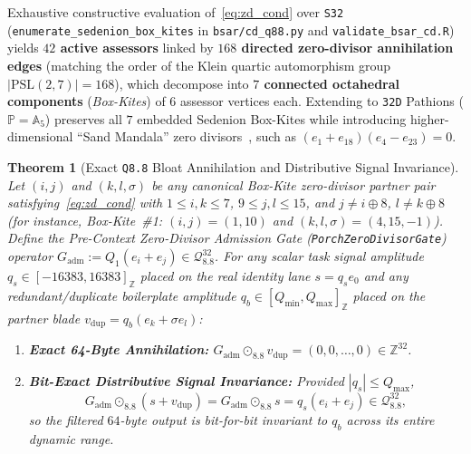 \documentclass[11pt]{article}
\theoremstyle{plain}
\newtheorem{theorem}{Theorem}[section]
\theoremstyle{definition}
\begin{document}
Exhaustive constructive evaluation of~\eqref{eq:zd_cond} over \texttt{S32} (\texttt{enumerate\_sedenion\_box\_kites} in \texttt{bsar/cd\_q88.py} and \texttt{validate\_bsar\_cd.R}) yields \textbf{$42$ active assessors} linked by \textbf{$168$ directed zero-divisor annihilation edges} (matching the order of the Klein quartic automorphism group $|\mathrm{PSL}(2,7)| = 168$), which decompose into \textbf{$7$ connected octahedral components} (\emph{Box-Kites}) of $6$ assessor vertices each. Extending to \texttt{32D} Pathions ($\mathbb{P} = \mathbb{A}_5$) preserves all $7$ embedded Sedenion Box-Kites while introducing higher-dimensional ``Sand Mandala'' zero divisors~\cite{demarrais2002}, such as $(e_1 + e_{18})(e_4 - e_{23}) = 0$.

\begin{theorem}[Exact \texttt{Q8.8} Bloat Annihilation and Distributive Signal Invariance]\label{thm:admission_gate}
Let $(i, j)$ and $(k, l, \sigma)$ be any canonical Box-Kite zero-divisor partner pair satisfying~\eqref{eq:zd_cond} with $1 \le i, k \le 7$, $9 \le j, l \le 15$, and $j \neq i \oplus 8$, $l \neq k \oplus 8$ (for instance, Box-Kite~\#1: $(i, j) = (1, 10)$ and $(k, l, \sigma) = (4, 15, -1)$). Define the Pre-Context Zero-Divisor Admission Gate (\texttt{PorchZeroDivisorGate}) operator $G_{\mathrm{adm}} := Q_1(e_i + e_j) \in \mathcal{Q}_{8.8}^{32}$. For any scalar task signal amplitude $q_s \in [-16383, 16383]_{\mathbb{Z}}$ placed on the real identity lane $s = q_s e_0$ and any redundant/duplicate boilerplate amplitude $q_b \in [Q_{\min}, Q_{\max}]_{\mathbb{Z}}$ placed on the partner blade $v_{\mathrm{dup}} = q_b(e_k + \sigma e_l)$:
\begin{enumerate}
  \item \textbf{Exact 64-Byte Annihilation:} $G_{\mathrm{adm}} \odot_{8.8} v_{\mathrm{dup}} = (0, 0, \dots, 0) \in \mathbb{Z}^{32}$.
  \item \textbf{Bit-Exact Distributive Signal Invariance:} Provided $|q_s| \le Q_{\max}$,
  \begin{equation}\label{eq:signal_invariance}
    G_{\mathrm{adm}} \odot_{8.8} (s + v_{\mathrm{dup}}) = G_{\mathrm{adm}} \odot_{8.8} s = q_s(e_i + e_j) \in \mathcal{Q}_{8.8}^{32},
  \end{equation}
  so the filtered $64$-byte output is bit-for-bit invariant to $q_b$ across its entire dynamic range.
\end{enumerate}
\end{theorem}
\end{document}
